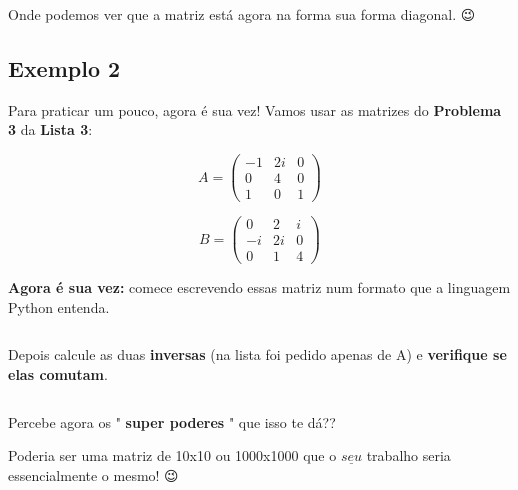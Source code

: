 \documentclass[11pt]{article}
\makeatletter
\newcommand{\boxspacing}{\kern\kvtcb@left@rule\kern\kvtcb@boxsep}
\newcommand{\prompt}[4]{
        \ttfamily\llap{{\color{#2}[#3]:\hspace{3pt}#4}}\vspace{-\baselineskip}
    }
\makeatother
\begin{document}
    Onde podemos ver que a matriz está agora na forma sua forma diagonal. 😉

    \hypertarget{exemplo-2}{%
\subsection{Exemplo 2}\label{exemplo-2}}

Para praticar um pouco, agora é sua vez! Vamos usar as matrizes do
\textbf{Problema 3} da \textbf{Lista 3}:

\[
A=
\begin{pmatrix}
-1 & 2i & 0 \\
 0 &  4 & 0 \\
 1 &  0 & 1
\end{pmatrix}
\]

\[
B=
\begin{pmatrix}
 0 & 2  & i \\
-i & 2i & 0 \\
 0 &  1 & 4
\end{pmatrix}
\]

    \textbf{Agora é sua vez:} comece escrevendo essas matriz num formato que
a linguagem Python entenda.

    \begin{tcolorbox}[breakable, size=fbox, boxrule=1pt, pad at break*=1mm,colback=cellbackground, colframe=cellborder]
\prompt{In}{incolor}{ }{\boxspacing}
\begin{Verbatim}[commandchars=\\\{\}]

\end{Verbatim}
\end{tcolorbox}

    Depois calcule as duas \textbf{inversas} (na lista foi pedido apenas de
A) e \textbf{verifique se elas comutam}.

    \begin{tcolorbox}[breakable, size=fbox, boxrule=1pt, pad at break*=1mm,colback=cellbackground, colframe=cellborder]
\prompt{In}{incolor}{ }{\boxspacing}
\begin{Verbatim}[commandchars=\\\{\}]

\end{Verbatim}
\end{tcolorbox}

    Percebe agora os " \textbf{super poderes} " que isso te dá??

Poderia ser uma matriz de 10x10 ou 1000x1000 que o \(\underline{seu}\)
trabalho seria essencialmente o mesmo! 😉
\end{document}
